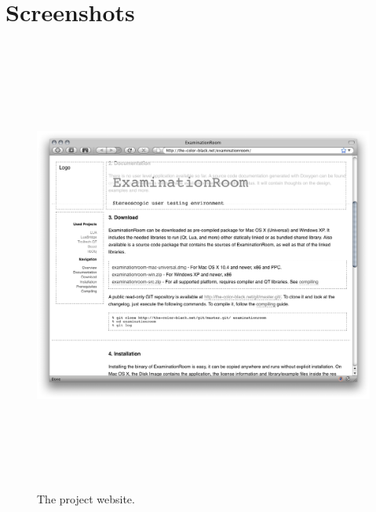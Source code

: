 \section*{Screenshots}

\begin{figure}
\begin{center}
\includegraphics[height=15cm]{screenshots/project_screenshot.png}
\caption{The project website.\label{ssProject}}
\end{center}
\end{figure}


